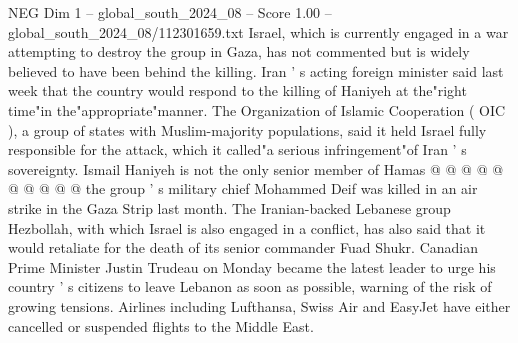 \begin{textsample}{NEG Dim 1 – global\_south\_2024\_08 – Score 1.00 – global\_south\_2024\_08/112301659.txt}
Israel, which is currently engaged in a war attempting to destroy the group in Gaza, has not commented but is widely believed to have been behind the killing.
Iran ' s acting foreign minister said last week that the country would respond to the killing of Haniyeh at the"right time"in the"appropriate"manner.
The Organization of Islamic Cooperation ( OIC ), a group of states with Muslim-majority populations, said it held Israel fully responsible for the attack, which it called"a serious infringement"of Iran ' s sovereignty.
Ismail Haniyeh is not the only senior member of Hamas @ @ @ @ @ @ @ @ @ @ the group ' s military chief Mohammed Deif was killed in an air strike in the Gaza Strip last month.
The Iranian-backed Lebanese group Hezbollah, with which Israel is also engaged in a conflict, has also said that it would retaliate for the death of its senior commander Fuad Shukr.
Canadian Prime Minister Justin Trudeau on Monday became the latest leader to urge his country ' s citizens to leave Lebanon as soon as possible, warning of the risk of growing tensions.
Airlines including Lufthansa, Swiss Air and EasyJet have either cancelled or suspended flights to the Middle East.

\end{textsample}
